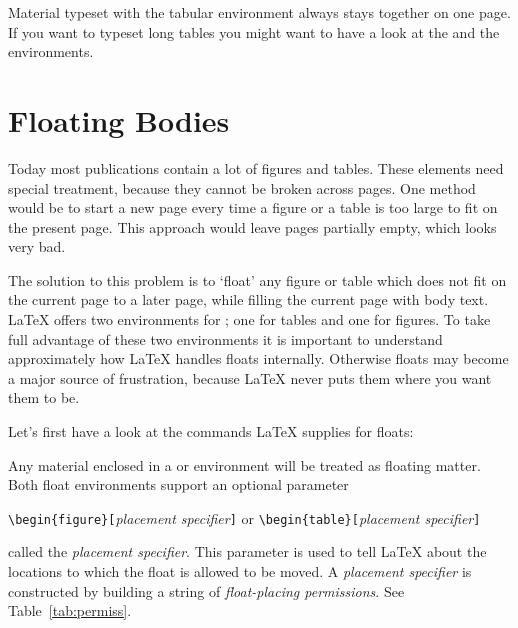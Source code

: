 Material typeset with the tabular environment always stays together on
one page. If you want to typeset long tables you might want to have a
look at the  and the  environments.

\section{Floating Bodies}
Today most publications contain a lot of figures and tables. These
elements need special treatment, because they cannot be broken across
pages.  One method would be to start a new page every time a figure or
a table is too large to fit on the present page. This approach would
leave pages partially empty, which looks very bad.

The solution to this problem is to `float' any figure or table which
does not fit on the current page to a later page, while filling the
current page with body text. \LaTeX{} offers two environments for
; one for tables and  one for figures.  To
take full advantage of these two environments it is important to
understand approximately how \LaTeX{} handles floats internally.
Otherwise floats may become a major source of frustration, because
\LaTeX{} never puts them where you want them to be.

\bigskip
Let's first have a look at the commands \LaTeX{} supplies
for floats:

Any material enclosed in a  or  environment will
be treated as floating matter. Both float environments support an optional
parameter
\begin{lscommand}
\verb|\begin{figure}[|\emph{placement specifier}\verb|]| or
\verb|\begin{table}[|\emph{placement specifier}\verb|]|
\end{lscommand}
\noindent called the \emph{placement specifier}. This parameter
is used to tell \LaTeX{} about the locations to which the float
is allowed to be moved.  A \emph{placement specifier} is constructed by building a string
of \emph{float-placing permissions}. See Table~\ref{tab:permiss}.

